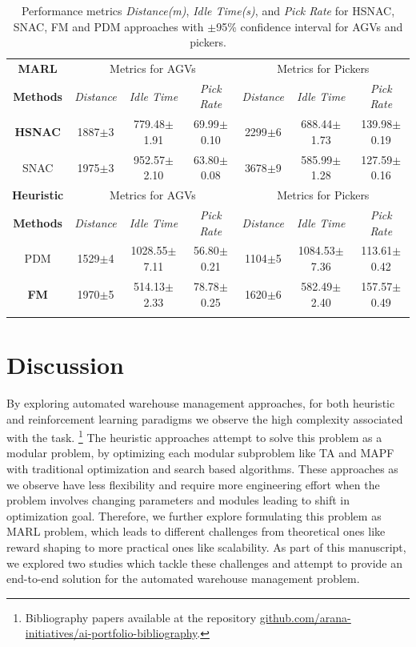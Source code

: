\documentclass{article}
\begin{document}
\begin{table}[t]
\centering
\caption{Performance metrics \textit{Distance(m)}, \textit{Idle Time(s)}, and \textit{Pick Rate} for HSNAC, SNAC, FM and PDM approaches with $\pm$95\% confidence interval for AGVs and pickers.}
     \label{table_scale_results}
    \begin{center}
        \begin{tabular}{ccccccc}
        \toprule
         \textbf{MARL}&\multicolumn{3}{c}{Metrics for AGVs}&\multicolumn{3}{c}{Metrics for Pickers}\\
         \textbf{Methods}&\textit{Distance}&\textit{Idle Time}&\textit{Pick Rate}&\textit{Distance}&\textit{Idle Time}&\textit{Pick Rate}\\
        \midrule 
        \textbf{HSNAC}&1887$\pm$3&779.48$\pm$1.91&69.99$\pm$0.10&2299$\pm$6&688.44$\pm$1.73&139.98$\pm$0.19\\
        {SNAC}&1975$\pm$3&952.57$\pm$2.10&63.80$\pm$0.08&3678$\pm$9&585.99$\pm$1.28&127.59$\pm$0.16\\
        \midrule 
        \midrule 
        \textbf{Heuristic}&\multicolumn{3}{c}{Metrics for AGVs}&\multicolumn{3}{c}{Metrics for Pickers}\\
         \textbf{Methods}&\textit{Distance}&\textit{Idle Time}&\textit{Pick Rate}&\textit{Distance}&\textit{Idle Time}&\textit{Pick Rate}\\
         \midrule 
        {PDM}&1529$\pm$4&1028.55$\pm$7.11&56.80$\pm$0.21&1104$\pm$5&1084.53$\pm$7.36&113.61$\pm$0.42\\
        \textbf{FM}&1970$\pm$5&514.13$\pm$2.33&78.78$\pm$0.25&1620$\pm$6&582.49$\pm$2.40&157.57$\pm$0.49\\
        \bottomrule
        \\
       \end{tabular}
     \end{center}
\end{table}


\section{Discussion}


By exploring automated warehouse management approaches, for both heuristic and reinforcement learning paradigms we observe the high complexity associated with the task.
\footnote{Bibliography papers available at the repository \href{https://github.com/arana-initiatives/ai-portfolio-bibliography}{github.com/arana-initiatives/ai-portfolio-bibliography}.}
The heuristic approaches attempt to solve this problem as a modular problem, by optimizing each modular subproblem like TA and MAPF with traditional optimization and search based algorithms.
These approaches as we observe have less flexibility and require more engineering effort when the problem involves changing parameters and modules leading to shift in optimization goal.
Therefore, we further explore formulating this problem as MARL problem, which leads to different challenges from theoretical ones like reward shaping to more practical ones like scalability.
As part of this manuscript, we explored two studies which tackle these challenges and attempt to provide an end-to-end solution for the automated warehouse management problem.
\end{document}
